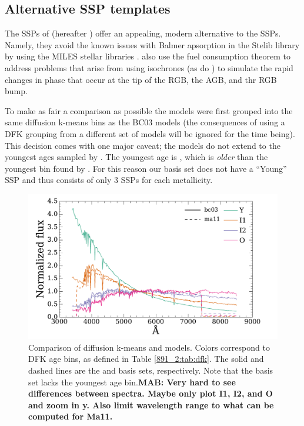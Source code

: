 \subsection{Alternative SSP templates}
\label{891_2:sec:ma11}

The SSPs of \citet{Maraston11} (hereafter )
offer an appealing, modern alternative to the 
SSPs. Namely, they avoid the known issues with Balmer apsorption in
the Stelib library \citep{Groves11} by using the MILES stellar
libraries \citep{Vazdekis10,Falcon-Barroso11}. 
also use the fuel consumption theorem
\citep{Renzini81,Buzzoni89,Maraston05} to address problems that arise
from using isochrones (as do ) to simulate the
rapid changes in phase that occur at the tip of the RGB, the AGB, and
thr RGB bump.

To make as fair a comparison as possible the 
models were first grouped into the same diffusion k-means bins as the
BC03 models (the consequences of using a DFK grouping from a different
set of models will be ignored for the time being). This decision comes
with one major caveat; the  models do not
extend to the youngest ages sampled by . The
youngest  age is , which is
\emph{older} than the youngest bin found by . For
this reason our  basis set does not have a
``Young'' SSP and thus consists of only 3 SSPs for each metallicity.

\begin{figure}
  \centering
  \includegraphics[width=\columnwidth]{891_2/figs/ma_bc_comp.pdf}
  \caption[Comparison of DFK BC03 and MA11 SSP template
    libraries]{\fixspacing\label{891_2:fig:ma_bc_comp}Comparison of
    diffusion k-means  and
     models. Colors correspond to DFK age bins,
    as defined in Table \ref{891_2:tab:dfk}. The solid and dashed
    lines are the  and 
    basis sets, respectively. Note that the 
    basis set lacks the youngest age bin.{\bf MAB: Very hard to see
      differences between spectra. Maybe only plot I1, I2, and O and
      zoom in y. Also limit wavelength range to what can be computed
      for Ma11.}}
\end{figure}

